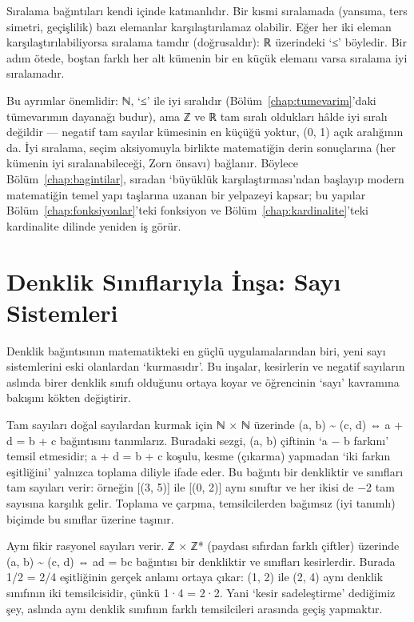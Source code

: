 Sıralama bağıntıları kendi içinde katmanlıdır. Bir kısmi sıralamada (yansıma, ters simetri, geçişlilik) bazı elemanlar karşılaştırılamaz olabilir. Eğer her iki eleman karşılaştırılabiliyorsa sıralama tamdır (doğrusaldır): ℝ üzerindeki ‘≤’ böyledir. Bir adım ötede, boştan farklı her alt kümenin bir en küçük elemanı varsa sıralama iyi sıralamadır.

Bu ayrımlar önemlidir: ℕ, ‘≤’ ile iyi sıralıdır (Bölüm~\ref{chap:tumevarim}’daki tümevarımın dayanağı budur), ama ℤ ve ℝ tam sıralı oldukları hâlde iyi sıralı değildir — negatif tam sayılar kümesinin en küçüğü yoktur, (0, 1) açık aralığının da. İyi sıralama, seçim aksiyomuyla birlikte matematiğin derin sonuçlarına (her kümenin iyi sıralanabileceği, Zorn önsavı) bağlanır. Böylece Bölüm~\ref{chap:bagintilar}, sıradan ‘büyüklük karşılaştırması’ndan başlayıp modern matematiğin temel yapı taşlarına uzanan bir yelpazeyi kapsar; bu yapılar Bölüm~\ref{chap:fonksiyonlar}’teki fonksiyon ve Bölüm~\ref{chap:kardinalite}’teki kardinalite dilinde yeniden iş görür.

\section{Denklik Sınıflarıyla İnşa: Sayı Sistemleri}

Denklik bağıntısının matematikteki en güçlü uygulamalarından biri, yeni sayı sistemlerini eski olanlardan ‘kurmasıdır’. Bu inşalar, kesirlerin ve negatif sayıların aslında birer denklik sınıfı olduğunu ortaya koyar ve öğrencinin ‘sayı’ kavramına bakışını kökten değiştirir.

Tam sayıları doğal sayılardan kurmak için ℕ × ℕ üzerinde (a, b) \textasciitilde{} (c, d) ⇔ a + d = b + c bağıntısını tanımlarız. Buradaki sezgi, (a, b) çiftinin ‘a − b farkını’ temsil etmesidir; a + d = b + c koşulu, kesme (çıkarma) yapmadan ‘iki farkın eşitliğini’ yalnızca toplama diliyle ifade eder. Bu bağıntı bir denkliktir ve sınıfları tam sayıları verir: örneğin [(3, 5)] ile [(0, 2)] aynı sınıftır ve her ikisi de −2 tam sayısına karşılık gelir. Toplama ve çarpma, temsilcilerden bağımsız (iyi tanımlı) biçimde bu sınıflar üzerine taşınır.

Aynı fikir rasyonel sayıları verir. ℤ × ℤ* (paydası sıfırdan farklı çiftler) üzerinde (a, b) \textasciitilde{} (c, d) ⇔ ad = bc bağıntısı bir denkliktir ve sınıfları kesirlerdir. Burada 1/2 = 2/4 eşitliğinin gerçek anlamı ortaya çıkar: (1, 2) ile (2, 4) aynı denklik sınıfının iki temsilcisidir, çünkü 1·4 = 2·2. Yani ‘kesir sadeleştirme’ dediğimiz şey, aslında aynı denklik sınıfının farklı temsilcileri arasında geçiş yapmaktır.


